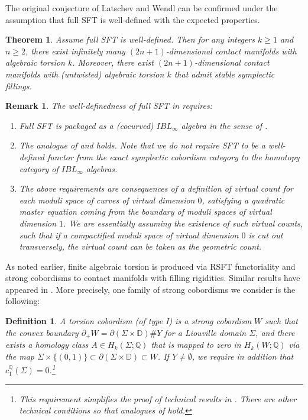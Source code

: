 \documentclass[11pt]{amsart}
\numberwithin{equation}{section}
\newtheorem{thmx}{Theorem}
\newtheorem{definition}[theorem]{\textbf{Definition}}
\newtheorem{remark}[theorem]{\textbf{Remark}}
\def\D{{\mathbb D}}
\def\Q{{\mathbb Q}}
\begin{document}
The original conjecture of Latschev and Wendl can be confirmed under the assumption that full SFT is well-defined with the expected properties.

\begin{thmx}\label{thm:finite_AT}
    Assume full SFT is well-defined. Then for any integers $k \ge 1$ and $n \ge 2$, there exist infinitely many $(2n+1)$-dimensional contact manifolds with algebraic torsion $k$. Moreover, there exist $(2n+1)$-dimensional contact manifolds with (untwisted) algebraic torsion $k$ that admit stable symplectic fillings.
\end{thmx}

\begin{remark}
    The well-definedness of full SFT in  requires:
    \begin{enumerate}
        \item Full SFT is packaged as a (cocurved) $IBL_\infty$ algebra in the sense of \cite[Definition 5.9]{moreno2024rsft}.
        \item The analogue of \cite[Theorem 3.10]{moreno2024landscape} and \cite[Proposition 3.9]{moreno2024rsft} holds. Note that we \emph{do not} require SFT to be a well-defined functor from the exact symplectic cobordism category to the homotopy category of $IBL_\infty$ algebras.
        \item The above requirements are consequences of a definition of virtual count for each moduli space of curves of virtual dimension $0$, satisfying a quadratic master equation coming from the boundary of moduli spaces of virtual dimension $1$. We are essentially assuming the existence of such virtual counts, such that if a compactified moduli space of virtual dimension $0$ is cut out transversely, the virtual count can be taken as the geometric count.
    \end{enumerate}
\end{remark}

As noted earlier, finite algebraic torsion is produced via RSFT functoriality and strong cobordisms to contact manifolds with filling rigidities. Similar results have appeared in \cite{+1}. More precisely, one family of strong cobordisms we consider is the following:

\begin{definition}\label{def:torsion_cobordism}
    A \emph{torsion cobordism} (of type I) is a strong cobordism $W$ such that the convex boundary $\partial_+ W = \partial(\Sigma\times \D)\# Y$ for a Liouville domain $\Sigma$, and there exists a homology class $A\in H_k(\Sigma;\Q)$ that is mapped to zero in $H_k(W;\Q)$ via the map $\Sigma\times \{(0,1)\}\subset \partial (\Sigma \times \D) \subset W$. If $Y\ne \emptyset$, we require in addition that $c_1^{\Q}(\Sigma)=0$.\footnote{This requirement simplifies the proof of technical results in . There are other technical conditions so that analogues of  hold.}
\end{definition}
\end{document}
